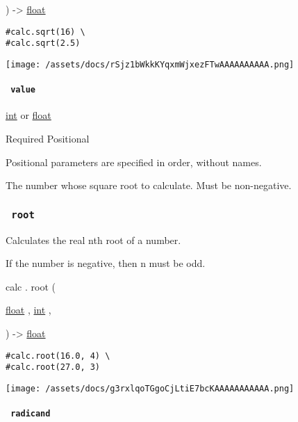 ) -\textgreater{} \href{/docs/reference/foundations/float/}{float}

\begin{verbatim}
#calc.sqrt(16) \
#calc.sqrt(2.5)
\end{verbatim}

\texttt{[image: /assets/docs/rSjz1bWkkKYqxmWjxezFTwAAAAAAAAAA.png]}

\paragraph{\texorpdfstring{\texttt{\ value\ }}{ value }}\label{functions-sqrt-value}

\href{/docs/reference/foundations/int/}{int} {or}
\href{/docs/reference/foundations/float/}{float}

{Required} {{ Positional }}

\label{functions-sqrt-value-positional-tooltip}
Positional parameters are specified in order, without names.

The number whose square root to calculate. Must be non-negative.

\subsubsection{\texorpdfstring{\texttt{\ root\ }}{ root }}\label{functions-root}

Calculates the real nth root of a number.

If the number is negative, then n must be odd.

calc { . } { root } (

{ \href{/docs/reference/foundations/float/}{float} , } {
\href{/docs/reference/foundations/int/}{int} , }

) -\textgreater{} \href{/docs/reference/foundations/float/}{float}

\begin{verbatim}
#calc.root(16.0, 4) \
#calc.root(27.0, 3)
\end{verbatim}

\texttt{[image: /assets/docs/g3rxlqoTGgoCjLtiE7bcKAAAAAAAAAAA.png]}

\paragraph{\texorpdfstring{\texttt{\ radicand\ }}{ radicand }}\label{functions-root-radicand}

